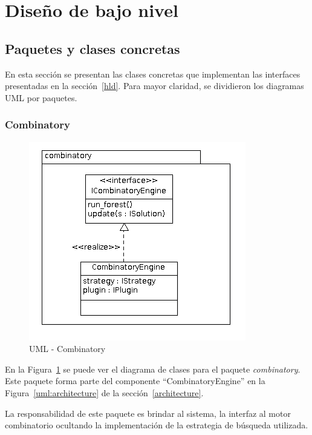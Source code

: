 \section{Dise\~no de bajo nivel}
\label{lld}  
  \subsection{Paquetes y clases concretas}
  En esta secci\'on se presentan las clases concretas que implementan las
interfaces presentadas en la secci\'on~\ref{hld}. Para mayor claridad, se
dividieron los diagramas UML por paquetes.

  \subsubsection{Combinatory}
  \begin{figure}
      \centering
      \includegraphics[scale=0.5]{lld-combinatory.png}  
      \caption{UML - Combinatory}
      \label{uml:lld-combinatory}
    \end{figure}
  En la Figura~\ref{uml:lld-combinatory} se puede ver el diagrama de clases
para el paquete \textit{combinatory}. Este paquete forma parte del componente
``CombinatoryEngine'' en la Figura~\ref{uml:architecture} de la
secci\'on~\ref{architecture}.

  La responsabilidad de este paquete es brindar al sistema, la interfaz al motor
combinatorio ocultando la implementaci\'on de la estrategia de b\'usqueda
utilizada.

